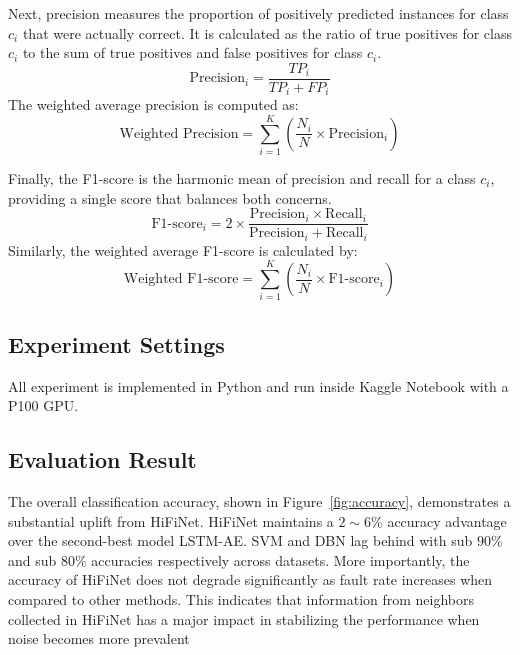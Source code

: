 Next, precision measures the proportion of positively predicted instances for class \(c_i\) that were actually correct. It is calculated as the ratio of true positives for class \(c_i\) to the sum of true positives and false positives for class \(c_i\).
\begin{equation}
  \text{Precision}_i = \frac{TP_i}{TP_i + FP_i}
\end{equation}
The weighted average precision is computed as:
\begin{equation}
  \text{Weighted Precision} = \sum_{i=1}^{K} \left( \frac{N_i}{N} \times \text{Precision}_i \right)
\end{equation}

Finally, the F1-score is the harmonic mean of precision and recall for a class \(c_i\), providing a single score that balances both concerns.
\begin{equation}
  \text{F1-score}_i = 2 \times \frac{\text{Precision}_i \times \text{Recall}_i}{\text{Precision}_i + \text{Recall}_i}
\end{equation}
Similarly, the weighted average F1-score is calculated by:
\begin{equation}
  \text{Weighted F1-score} = \sum_{i=1}^{K} \left( \frac{N_i}{N} \times \text{F1-score}_i \right)
\end{equation}

\subsection{Experiment Settings}
All experiment is implemented in Python and run inside Kaggle Notebook with a P100 GPU.

\subsection{Evaluation Result}
The overall classification accuracy, shown in Figure~\ref{fig:accuracy}, demonstrates a substantial uplift from HiFiNet. HiFiNet maintains a \(2\sim6\%\) accuracy advantage over the second-best model LSTM-AE. SVM and DBN lag behind with sub \(90\%\) and sub \(80\%\) accuracies respectively across datasets. More importantly, the accuracy of HiFiNet does not degrade significantly as fault rate increases when compared to other methods. This indicates that information from neighbors collected in HiFiNet has a major impact in stabilizing the performance when noise becomes more prevalent

